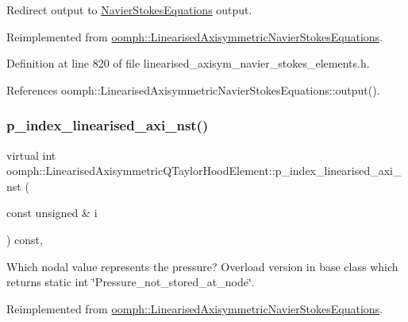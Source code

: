 Redirect output to \hyperlink{classoomph_1_1NavierStokesEquations}{Navier\+Stokes\+Equations} output. 



Reimplemented from \hyperlink{classoomph_1_1LinearisedAxisymmetricNavierStokesEquations_a19ee5f4d8f6e187300f135b3eb69d194}{oomph\+::\+Linearised\+Axisymmetric\+Navier\+Stokes\+Equations}.



Definition at line 820 of file linearised\+\_\+axisym\+\_\+navier\+\_\+stokes\+\_\+elements.\+h.



References oomph\+::\+Linearised\+Axisymmetric\+Navier\+Stokes\+Equations\+::output().

\mbox{\label{classoomph_1_1LinearisedAxisymmetricQTaylorHoodElement_aba8d88861814753c5aeeb26f0985c3d9}} 
\subsubsection{\texorpdfstring{p\+\_\+index\+\_\+linearised\+\_\+axi\+\_\+nst()}{p\_index\_linearised\_axi\_nst()}}
{\footnotesize\ttfamily virtual int oomph\+::\+Linearised\+Axisymmetric\+Q\+Taylor\+Hood\+Element\+::p\+\_\+index\+\_\+linearised\+\_\+axi\+\_\+nst (\begin{DoxyParamCaption}\item[{const unsigned \&}]{i }\end{DoxyParamCaption}) const\hspace{0.3cm}{\ttfamily [inline]}, {\ttfamily [virtual]}}



Which nodal value represents the pressure? Overload version in base class which returns static int \char`\"{}\+Pressure\+\_\+not\+\_\+stored\+\_\+at\+\_\+node\char`\"{}. 



Reimplemented from \hyperlink{classoomph_1_1LinearisedAxisymmetricNavierStokesEquations_af4828bf6fb5dbd8ff92e159676460d49}{oomph\+::\+Linearised\+Axisymmetric\+Navier\+Stokes\+Equations}.



